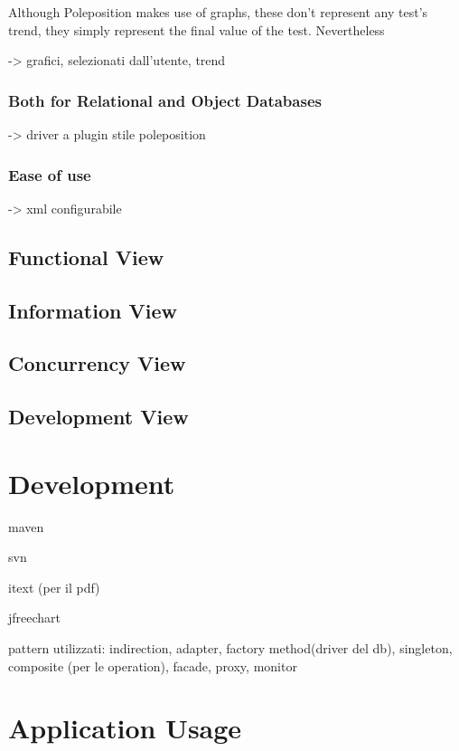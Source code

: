 Although Poleposition makes use of graphs, these don't represent any test's trend, they simply represent the final value of the test. Nevertheless 





			 -> grafici, selezionati dall'utente, trend
			 
			\subsubsection{Both for Relational and Object Databases}
			 -> driver a plugin stile poleposition
			 
			\subsubsection{Ease of use}
			 -> xml configurabile
				
		
		\subsection{Functional View}
		
		\subsection{Information View}
		
		\subsection{Concurrency View}
		
		\subsection{Development View}
	
	\section{Development}
	
		maven
		
		svn
		
		itext (per il pdf)
		
		jfreechart
		
		pattern utilizzati: indirection, adapter, factory method(driver del db), singleton, 
		composite (per le operation), facade, proxy, monitor
	
	\section{Application Usage}
